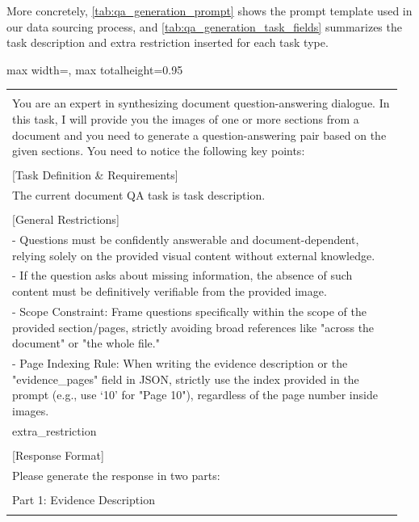 \documentclass{llmxive}
\providecommand{\promptplaceholder}[1]{\colorbox{gray!12}{\ttfamily #1}}
\begin{document}
{{{More concretely, \cref{tab:qa_generation_prompt} shows the prompt template used in our data sourcing process, and \cref{tab:qa_generation_task_fields} summarizes the task description and extra restriction inserted for each task type.


\begin{table}[!htbp]
 \centering
 \begin{adjustbox}{max width=\textwidth, max totalheight=0.95\textheight}
 \begin{tabular}{p{0.96\linewidth}}
 \toprule
 \begin{minipage}{0.96\linewidth}
 \ttfamily\footnotesize
 {[}System{]}\\
 You are an expert in synthesizing document question-answering dialogue. In this task, I will provide you the images of one or more sections from a document and you need to generate a question-answering pair based on the given sections.
 You need to notice the following key points:\\[2pt]
 \quad \\
 {[}Task Definition \& Requirements{]}\\
 The current document QA task is \promptplaceholder{task description}.\\[2pt]
 \quad \\
 {[}General Restrictions{]}\\
 - Questions must be confidently answerable and document-dependent, relying solely on the provided visual content without external knowledge.\\
 - If the question asks about missing information, the absence of such content must be definitively verifiable from the provided image.\\
 - Scope Constraint: Frame questions specifically within the scope of the provided section/pages, strictly avoiding broad references like "across the document" or "the whole file."\\
 - Page Indexing Rule: When writing the evidence description or the "evidence\_pages" field in JSON, strictly use the index provided in the prompt (e.g., use `10' for "Page 10"), regardless of the page number inside images.\\[2pt]
 \promptplaceholder{extra\_restriction} \\
 \quad \\
 {[}Response Format{]}\\
 Please generate the response in two parts: \\
 \quad \\
 Part 1: Evidence Description \\

\end{minipage}
\end{tabular}
\end{adjustbox}
\end{table}}}}
\end{document}
